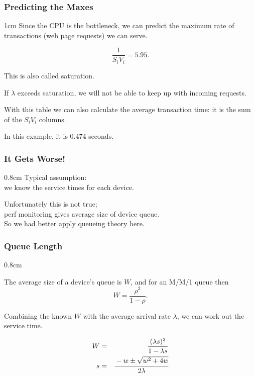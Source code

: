\begin{frame}
\frametitle{Predicting the Maxes}

\begin{changemargin}{1cm}
\large 
Since the CPU is the bottleneck, we can predict the maximum rate of transactions (web page requests) we can serve. 

\[ \dfrac{1}{S_{i}V_{i}} = 5.95. \]

This is also called saturation.

 If $\lambda$ exceeds saturation, we will not be able to keep up with incoming requests.

With this table we can also calculate the average transaction time: it is the sum of the $S_{i}V_{i}$ columns. 

In this example, it is 0.474 seconds. 
\end{changemargin}

\end{frame}



\begin{frame}
\frametitle{It Gets Worse!}

\begin{changemargin}{0.8cm}
\large 
Typical assumption: \\
\qquad we know the service times for each device. 

Unfortunately this is not true;\\
\qquad perf monitoring gives average size of device queue. \\[1em]

So we had better apply queueing theory here.
\end{changemargin}


\end{frame}



\begin{frame}
\frametitle{Queue Length}

\begin{changemargin}{0.8cm}
\large 

The average size of a device's queue is $W$, and for an M/M/1 queue then 
\[ W = \dfrac{\rho^{2}}{1-\rho}.\]

Combining the known $W$ with the average arrival rate $\lambda$, we can work out the service time. 

\begin{eqnarray*}
W &=& \dfrac{(\lambda s)^{2}}{1 - \lambda s}\\
s &=& \cfrac{-w \pm \sqrt{w^{2}+4w}}{2\lambda}\\
\end{eqnarray*}
\end{changemargin}



\end{frame}




